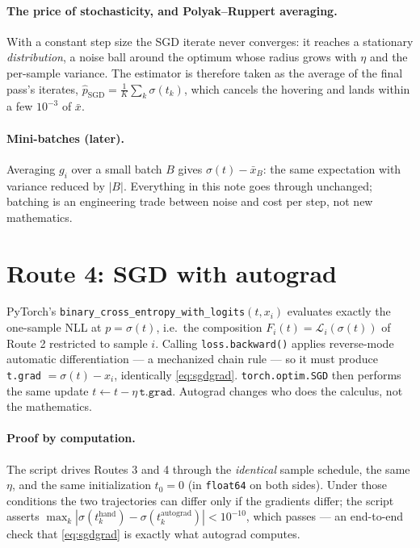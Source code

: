 \documentclass[11pt]{article}
\newcommand{\sigmoid}{\sigma}
\newcommand{\xbar}{\bar{x}}
\begin{document}
\paragraph{The price of stochasticity, and Polyak--Ruppert averaging.}
With a constant step size the SGD iterate never converges: it reaches a
stationary \emph{distribution}, a noise ball around the optimum whose
radius grows with $\eta$ and the per-sample variance. The estimator is
therefore taken as the average of the final pass's iterates,
$\hat{p}_{\mathrm{SGD}} = \tfrac1K \sum_k \sigmoid(t_k)$, which cancels
the hovering and lands within a few $10^{-3}$ of $\xbar$.

\paragraph{Mini-batches (later).}
Averaging $g_i$ over a small batch $B$ gives $\sigmoid(t)-\xbar_B$: the
same expectation with variance reduced by $|B|$. Everything in this note
goes through unchanged; batching is an engineering trade between noise and
cost per step, not new mathematics.

\section{Route 4: SGD with autograd}

PyTorch's \texttt{binary\_cross\_entropy\_with\_logits}$(t, x_i)$
evaluates exactly the one-sample NLL at $p = \sigmoid(t)$, i.e.\ the
composition $F_i(t) = \mathcal{L}_i(\sigmoid(t))$ of Route 2 restricted to
sample $i$. Calling \texttt{loss.backward()} applies reverse-mode
automatic differentiation --- a mechanized chain rule --- so it must
produce \texttt{t.grad} $= \sigmoid(t) - x_i$, identically
\eqref{eq:sgdgrad}. \texttt{torch.optim.SGD} then performs the same update
$t \leftarrow t - \eta\,\texttt{t.grad}$. Autograd changes who does the
calculus, not the mathematics.

\paragraph{Proof by computation.}
The script drives Routes 3 and 4 through the \emph{identical} sample
schedule, the same $\eta$, and the same initialization $t_0 = 0$ (in
\texttt{float64} on both sides). Under those conditions the two
trajectories can differ only if the gradients differ; the script asserts
$\max_k |\sigmoid(t_k^{\text{hand}}) - \sigmoid(t_k^{\text{autograd}})| <
10^{-10}$, which passes --- an end-to-end check that
\eqref{eq:sgdgrad} is exactly what autograd computes.
\end{document}
